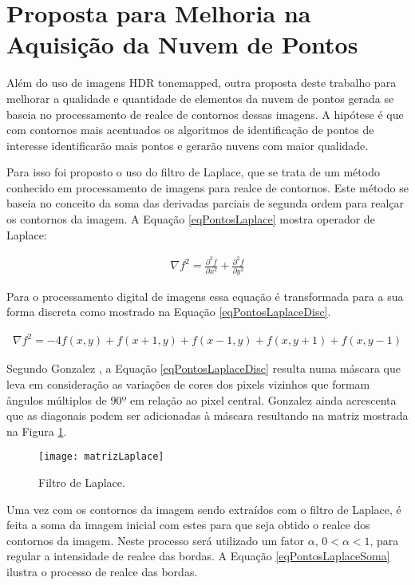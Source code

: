\section{Proposta para Melhoria na Aquisição da Nuvem de Pontos} \label{pontosProposta}

Além do uso de imagens HDR tonemapped, outra proposta deste trabalho para melhorar a qualidade e quantidade de elementos da nuvem de pontos gerada se baseia no processamento de realce de contornos dessas imagens. A hipótese é que com contornos mais acentuados os algoritmos de identificação de pontos de interesse identificarão mais pontos e gerarão nuvens com maior qualidade.

Para isso foi proposto o uso do filtro de Laplace, que se trata de um método conhecido em processamento de imagens para realce de contornos. Este método se baseia no conceito da soma das derivadas parciais de segunda ordem \cite{gonzalez} para realçar os contornos da imagem. A Equação \ref{eqPontosLaplace} mostra operador de Laplace: \cite{gonzalez}

\begin{align} \label{eqPontosLaplace}
	\nabla f^2 = \frac{\partial^2f}{\partial x^2} + \frac{\partial^2f}{\partial y^2}
\end{align}

Para o processamento digital de imagens essa equação é transformada para a sua forma discreta como mostrado na Equação \ref{eqPontosLaplaceDisc}. \cite{gonzalez}

\begin{align} \label{eqPontosLaplaceDisc}
	\nabla f^2 = -4f(x,y) + f(x+1,y) + f(x-1,y) + f(x,y+1) + f(x,y-1)
\end{align}

Segundo Gonzalez \cite{gonzalez}, a Equação \ref{eqPontosLaplaceDisc} resulta numa máscara que leva em consideração as variações de cores dos pixels vizinhos que formam ângulos múltiplos de $90º$ em relação ao pixel central. Gonzalez \cite{gonzalez} ainda acrescenta que as diagonais podem ser adicionadas à máscara resultando na matriz mostrada na Figura \ref{figPontosLaplaceMat}.

\begin{figure}[H]
  \centering
  \texttt{[image: matrizLaplace]}
  \caption{Filtro de Laplace.}
  \label{figPontosLaplaceMat}
\end{figure}

Uma vez com os contornos da imagem sendo extraídos com o filtro de Laplace, é feita a soma da imagem inicial com estes para que seja obtido o realce dos contornos da imagem. Neste processo será utilizado um fator $\alpha$, $0 < \alpha < 1$, para regular a intensidade de realce das bordas. A Equação \ref{eqPontosLaplaceSoma} ilustra o processo de realce das bordas.

